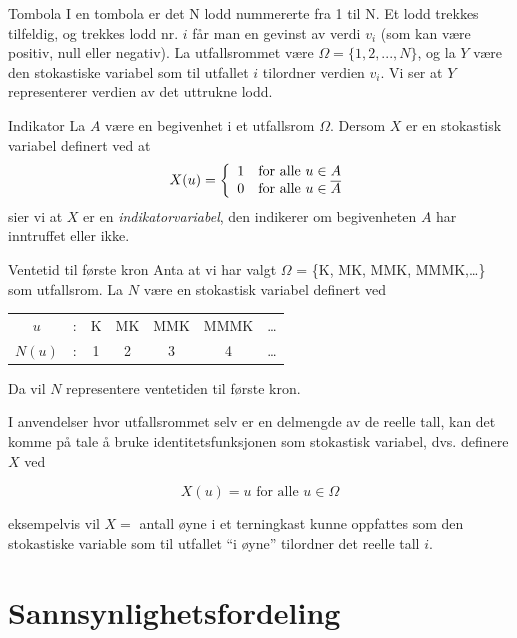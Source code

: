 \begin{eksempel}{Tombola}
I en tombola er det N lodd nummererte fra 1 til N.
Et lodd trekkes tilfeldig, og trekkes lodd nr. $i$ får man en
gevinst av verdi $v_i$ (som kan være positiv, null eller
negativ). La utfallsrommet være $\Omega = \{1,2,...,N\}$, og la
$Y$ være den stokastiske variabel som til utfallet $i$ tilordner
verdien $v_i$. Vi ser at $Y$ representerer verdien av det
uttrukne lodd.
\end{eksempel}

\begin{eksempel}{Indikator}
La $A$ være en begivenhet i et utfallsrom $\Omega$.
Dersom $X$ er en stokastisk variabel definert ved at
\[   X(u)= \left\{ \begin{array}{ll}
    1 & \mbox{for alle  $u \in A$} \\
    0 & \mbox{for alle $ u \in \bar{A}$}
            \end{array} \right. \]
\noindent sier vi at $X$ er en {\em indikatorvariabel}, den indikerer om
begivenheten $A$ har inntruffet eller ikke.
\end{eksempel}

\begin{eksempel}{Ventetid til første kron}
Anta at vi har valgt $\Omega$ = \{K, MK, MMK, MMMK,\ldots\} som
utfallsrom. La $N$ være en stokastisk variabel definert ved
\begin{center}
 \begin{tabular}{ccccccc}
            $u$ & : & K & MK & MMK & MMMK & \ldots \\
         $N(u)$ & : & 1 & 2  &  3  &  4   & \ldots
 \end{tabular}
\end{center}
Da vil $N$ representere ventetiden til første kron.
\end{eksempel}

I anvendelser hvor utfallsrommet selv er en delmengde av de
reelle tall, kan det komme på tale å bruke identitetsfunksjonen
som stokastisk variabel, dvs. definere $X$ ved

\[  X(u) = u \mbox{\ \ for alle  } u \in \Omega \]

\noindent eksempelvis vil $X=$ antall øyne i et terningkast kunne
oppfattes som den stokastiske variable som til utfallet ``i øyne''
tilordner det reelle tall $i$.


\section{Sannsynlighetsfordeling}

